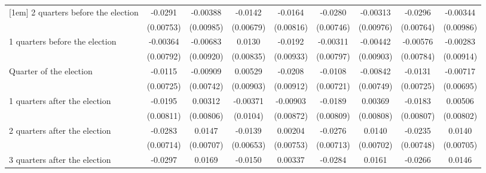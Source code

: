 \begin{table}[htbp]
\begin{tabular}{l*{8}{c}}
[1em]
 2 quarters before the election&     -0.0291\sym{***}&    -0.00388         &     -0.0142\sym{*}  &     -0.0164\sym{*}  &     -0.0280\sym{***}&    -0.00313         &     -0.0296\sym{***}&    -0.00344         \\
                    &   (0.00753)         &   (0.00985)         &   (0.00679)         &   (0.00816)         &   (0.00746)         &   (0.00976)         &   (0.00764)         &   (0.00986)         \\
[1em]
 1 quarters before the election&    -0.00364         &    -0.00683         &      0.0130         &     -0.0192\sym{*}  &    -0.00311         &    -0.00442         &    -0.00576         &    -0.00283         \\
                    &   (0.00792)         &   (0.00920)         &   (0.00835)         &   (0.00933)         &   (0.00797)         &   (0.00903)         &   (0.00784)         &   (0.00914)         \\
[1em]
Quarter of the election&     -0.0115         &    -0.00909         &     0.00529         &     -0.0208\sym{*}  &     -0.0108         &    -0.00842         &     -0.0131         &    -0.00717         \\
                    &   (0.00725)         &   (0.00742)         &   (0.00903)         &   (0.00912)         &   (0.00721)         &   (0.00749)         &   (0.00725)         &   (0.00695)         \\
[1em]
 1 quarters after the election&     -0.0195\sym{*}  &     0.00312         &    -0.00371         &    -0.00903         &     -0.0189\sym{*}  &     0.00369         &     -0.0183\sym{*}  &     0.00506         \\
                    &   (0.00811)         &   (0.00806)         &    (0.0104)         &   (0.00872)         &   (0.00809)         &   (0.00808)         &   (0.00807)         &   (0.00802)         \\
[1em]
 2 quarters after the election&     -0.0283\sym{***}&      0.0147\sym{*}  &     -0.0139\sym{*}  &     0.00204         &     -0.0276\sym{***}&      0.0140\sym{*}  &     -0.0235\sym{**} &      0.0140\sym{*}  \\
                    &   (0.00714)         &   (0.00707)         &   (0.00653)         &   (0.00753)         &   (0.00713)         &   (0.00702)         &   (0.00748)         &   (0.00705)         \\
[1em]
 3 quarters after the election&     -0.0297\sym{***}&      0.0169\sym{*}  &     -0.0150\sym{*}  &     0.00337         &     -0.0284\sym{***}&      0.0161\sym{*}  &     -0.0266\sym{***}&      0.0146\sym{*}  \\

\end{tabular}
\end{table}

